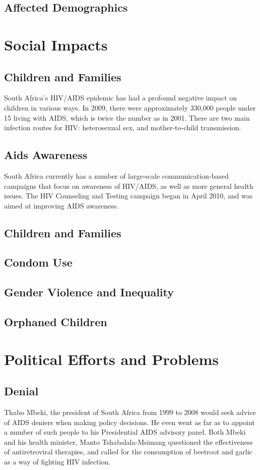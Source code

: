 \documentclass[12pt]{article}
\begin{document}
\subsection{Affected Demographics}

\section{Social Impacts}

\subsection{Children and Families}
South Africa's HIV/AIDS epidemic has had a profound negative impact on children in various ways.  
In 2009, there were approximately 330,000 people under 15 living with AIDS, which is twice the number as in 2001.
There are two main infection routes for HIV: heterosexual sex, and mother-to-child transmission. 

\subsection{Aids Awareness}
South Africa currently has a number of large-scale communication-based campaigns that focus on awareness of HIV/AIDS, as well as more general health issues.
The HIV Counseling and Testing campaign began in April 2010, and was aimed at improving AIDS awareness.

\subsection{Children and Families}
\subsection{Condom Use}
\subsection{Gender Violence and Inequality}
\subsection{Orphaned Children}


\section{Political Efforts and Problems}
\subsection{Denial}
Thabo Mbeki, the president of South Africa from 1999 to 2008 would seek advice of AIDS deniers when making policy decisions.  
He even went as far as to appoint a number of such people to his Presidential AIDS advisory panel.  
Both Mbeki and his health minister, Manto Tshabalala-Msimang questioned the effectiveness of antiretroviral therapies, and called for the consumption of beetroot and garlic as a way of fighting HIV infection.
\end{document}
